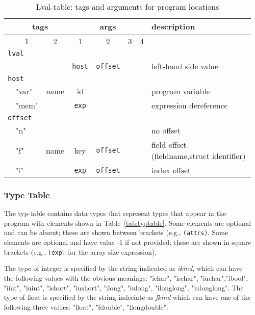 \documentclass[11pt]{article}
\begin{document}
\begin{table}
\centering
\begin{tabular}{l|l|c||c|c|c|c||l}
& \multicolumn{2}{c||}{tags} & \multicolumn{4}{|c||}{args} & description \\ \hline
& \multicolumn{1}{c|}{1} & 2 & 1 & 2 & 3 & 4 & \\ \hline 
\multicolumn{8}{l}{{\tt lval}} \\ \hline
& & & {\tt host} & {\tt offset} & & & left-hand side value \\ \hline
\multicolumn{8}{l}{{\tt host}} \\ \hline
& "var" & name & id & & & & program variable \\
& "mem" & & {\tt exp} & & & & expression dereference \\ \hline
\multicolumn{8}{l}{{\tt offset}} \\ \hline
& "n" & & & & & & no offset \\
& "f" & name & key & {\tt offset} & & & field offset (fieldname,struct identifier) \\
& "i" & & {\tt exp} & {\tt offset} & & & index offset \\ \hline
\end{tabular}
\caption{\label{tab:lvaltable}Lval-table: tags and arguments for program locations}
\end{table}


\subsubsection{Type Table}

The typ-table contains data types that represent types that appear in the program
with elements shown in Table~\ref{tab:typtable}.
Some elements are optional and can be absent; these are shown between brackets
(e.g., {\tt (attrs)}. Some elements are optional and have value -1 if not provided;
these are shown in square brackets (e.g., {\tt [exp]} for the array size expression).

The type of integer is specified by the string indicated as \emph{ikind}, which can 
have the following values with the obvious meanings: "ichar", "ischar", "iuchar","ibool",
   "iint", "iuint", "ishort", "iushort", "ilong", "iulong", "ilonglong", "iulonglong".
The type of float is specified by the string indeciate as \emph{fkind} which can 
have one of the following three values: "float", "fdouble", "flongdouble".
\end{document}
